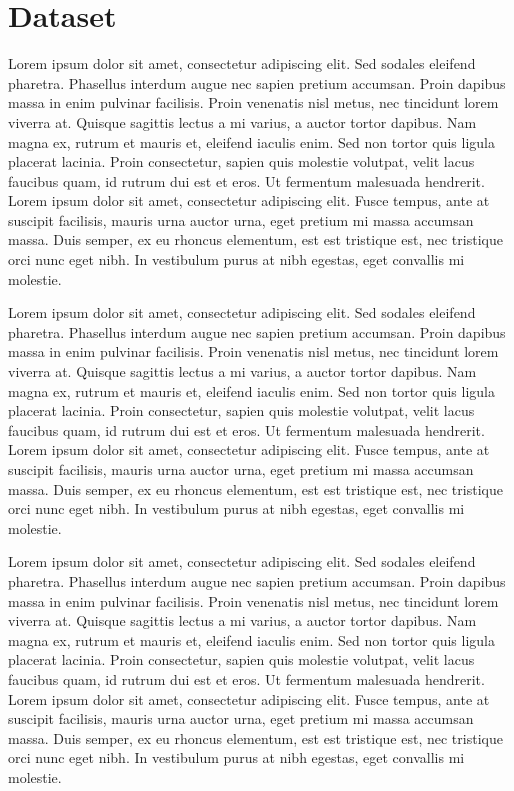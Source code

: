 \section{Dataset}
Lorem ipsum dolor sit amet, consectetur adipiscing elit. Sed sodales
eleifend pharetra. Phasellus interdum augue nec sapien pretium accumsan.
Proin dapibus massa in enim pulvinar facilisis. Proin venenatis nisl metus,
nec tincidunt lorem viverra at. Quisque sagittis lectus a mi varius, a
auctor tortor dapibus. Nam magna ex, rutrum et mauris et, eleifend iaculis
enim. Sed non tortor quis ligula placerat lacinia. Proin consectetur, sapien
quis molestie volutpat, velit lacus faucibus quam, id rutrum dui est et
eros. Ut fermentum malesuada hendrerit. Lorem ipsum dolor sit amet,
consectetur adipiscing elit. Fusce tempus, ante at suscipit facilisis,
mauris urna auctor urna, eget pretium mi massa accumsan massa. Duis semper,
ex eu rhoncus elementum, est est tristique est, nec tristique orci nunc eget
nibh. In vestibulum purus at nibh egestas, eget convallis mi molestie.

Lorem ipsum dolor sit amet, consectetur adipiscing elit. Sed sodales
eleifend pharetra. Phasellus interdum augue nec sapien pretium accumsan.
Proin dapibus massa in enim pulvinar facilisis. Proin venenatis nisl metus,
nec tincidunt lorem viverra at. Quisque sagittis lectus a mi varius, a
auctor tortor dapibus. Nam magna ex, rutrum et mauris et, eleifend iaculis
enim. Sed non tortor quis ligula placerat lacinia. Proin consectetur, sapien
quis molestie volutpat, velit lacus faucibus quam, id rutrum dui est et
eros. Ut fermentum malesuada hendrerit. Lorem ipsum dolor sit amet,
consectetur adipiscing elit. Fusce tempus, ante at suscipit facilisis,
mauris urna auctor urna, eget pretium mi massa accumsan massa. Duis semper,
ex eu rhoncus elementum, est est tristique est, nec tristique orci nunc eget
nibh. In vestibulum purus at nibh egestas, eget convallis mi molestie.

Lorem ipsum dolor sit amet, consectetur adipiscing elit. Sed sodales
eleifend pharetra. Phasellus interdum augue nec sapien pretium accumsan.
Proin dapibus massa in enim pulvinar facilisis. Proin venenatis nisl metus,
nec tincidunt lorem viverra at. Quisque sagittis lectus a mi varius, a
auctor tortor dapibus. Nam magna ex, rutrum et mauris et, eleifend iaculis
enim. Sed non tortor quis ligula placerat lacinia. Proin consectetur, sapien
quis molestie volutpat, velit lacus faucibus quam, id rutrum dui est et
eros. Ut fermentum malesuada hendrerit. Lorem ipsum dolor sit amet,
consectetur adipiscing elit. Fusce tempus, ante at suscipit facilisis,
mauris urna auctor urna, eget pretium mi massa accumsan massa. Duis semper,
ex eu rhoncus elementum, est est tristique est, nec tristique orci nunc eget
nibh. In vestibulum purus at nibh egestas, eget convallis mi molestie.

